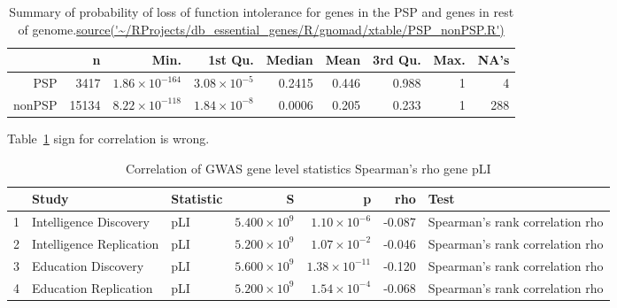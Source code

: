 \begin{table}[ht]
\centering
\begin{tabular}{rrrrrrrrr}
  \hline
 & n & Min. & 1st Qu. & Median & Mean & 3rd Qu. & Max. & NA's \\ 
  \hline
PSP & 3417 & $1.86 \times 10^{-164}$ & $3.08 \times 10^{-5}$ & 0.2415 & 0.446 & 0.988 & 1 & 4 \\ 
  nonPSP & 15134 & $8.22 \times 10^{-118}$ & $1.84 \times 10^{-8}$ & 0.0006 & 0.205 & 0.233 & 1 & 288 \\ 
   \hline
\end{tabular}
\caption{Summary of probability of loss of function intolerance for genes in the PSP and genes in rest of genome.\url{source('~/RProjects/db_essential_genes/R/gnomad/xtable/PSP_nonPSP.R')}}
\end{table}



Table~\ref{Table:Correlation of GWAS gene level statistics Spearmans rho gene pLI} sign for correlation is wrong.
\begin{table}[ht]
\centering
\begin{adjustbox}{max width=\textwidth}
\begin{tabular}{rllrrrl}
  \hline
 & Study & Statistic & S & p & rho & Test \\ 
  \hline
1 & Intelligence Discovery & pLI & $5.400 \times 10^{9}$ & $1.10 \times 10^{-6}$ & -0.087 & Spearman's rank correlation rho \\ 
  2 & Intelligence Replication & pLI & $5.200 \times 10^{9}$ & $1.07 \times 10^{-2}$ & -0.046 & Spearman's rank correlation rho \\ 
  3 & Education Discovery & pLI & $5.600 \times 10^{9}$ & $1.38 \times 10^{-11}$ & -0.120 & Spearman's rank correlation rho \\ 
  4 & Education Replication & pLI & $5.200 \times 10^{9}$ & $1.54 \times 10^{-4}$ & -0.068 & Spearman's rank correlation rho \\ 
   \hline
\end{tabular}
\end{adjustbox}
\caption{Correlation of GWAS gene level statistics Spearman's rho gene pLI} 
\label{Table:Correlation of GWAS gene level statistics Spearmans rho gene pLI}
\end{table}

